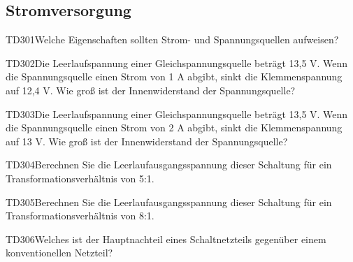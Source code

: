 \subsection{Stromversorgung}

\begin{question}{TD301}{Welche Eigenschaften sollten Strom- und Spannungsquellen aufweisen?}
\end{question}

\begin{question}{TD302}{Die Leerlaufspannung einer Gleichspannungsquelle beträgt 13,5 V. Wenn die Spannungsquelle einen Strom von 1 A abgibt, sinkt die Klemmenspannung auf 12,4 V. Wie groß ist der Innenwiderstand der Spannungsquelle?}
\end{question}

\begin{question}{TD303}{Die Leerlaufspannung einer Gleichspannungsquelle beträgt 13,5 V. Wenn die Spannungsquelle einen Strom von 2 A abgibt, sinkt die Klemmenspannung auf 13 V. Wie groß ist der Innenwiderstand der Spannungsquelle?}
\end{question}

\begin{question}{TD304}{Berechnen Sie die Leerlaufausgangsspannung dieser Schaltung für ein Transformationsverhältnis von 5:1.}
\end{question}

\begin{question}{TD305}{Berechnen Sie die Leerlaufausgangsspannung dieser Schaltung für ein Transformationsverhältnis von 8:1.}
\end{question}

\begin{question}{TD306}{Welches ist der Hauptnachteil eines Schaltnetzteils gegenüber einem konventionellen Netzteil?}
\end{question}

